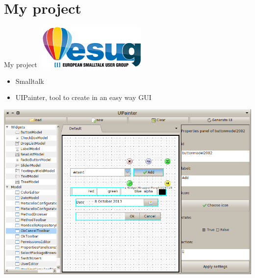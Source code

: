 \documentclass[11pt]{beamer}
\begin{document}
\section{My project}
\begin{frame}{My project}
		\hbox{ 
     		\hspace*{5cm}
			\includegraphics[scale=0.3]{images/esug.png}
		}
	\begin{itemize}
		\item Smalltalk 
		\item UIPainter, tool to create in an easy way GUI
	\end{itemize}
	\begin{center}
		\includegraphics[scale=0.28]{images/uipainter.png}	
	\end{center}
\end{frame}
\end{document}
